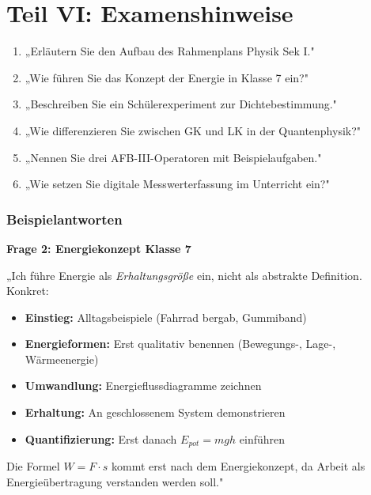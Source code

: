 \documentclass[11pt,a4paper]{article}
\begin{document}
\newpage
\part*{Teil VI: Examenshinweise}

\begin{exambox}
\begin{enumerate}[leftmargin=0.5cm, itemsep=3pt]
\item „Erläutern Sie den Aufbau des Rahmenplans Physik Sek I."
\item „Wie führen Sie das Konzept der Energie in Klasse 7 ein?"
\item „Beschreiben Sie ein Schülerexperiment zur Dichtebestimmung."
\item „Wie differenzieren Sie zwischen GK und LK in der Quantenphysik?"
\item „Nennen Sie drei AFB-III-Operatoren mit Beispielaufgaben."
\item „Wie setzen Sie digitale Messwerterfassung im Unterricht ein?"
\end{enumerate}
\end{exambox}

\section{Beispielantworten}

\textbf{Frage 2: Energiekonzept Klasse 7}

„Ich führe Energie als \textit{Erhaltungsgröße} ein, nicht als abstrakte Definition. Konkret:
\begin{itemize}[leftmargin=0.5cm, itemsep=1pt]
\item \textbf{Einstieg:} Alltagsbeispiele (Fahrrad bergab, Gummiband)
\item \textbf{Energieformen:} Erst qualitativ benennen (Bewegungs-, Lage-, Wärmeenergie)
\item \textbf{Umwandlung:} Energieflussdiagramme zeichnen
\item \textbf{Erhaltung:} An geschlossenem System demonstrieren
\item \textbf{Quantifizierung:} Erst danach $E_{pot} = mgh$ einführen
\end{itemize}
Die Formel $W = F \cdot s$ kommt erst nach dem Energiekonzept, da Arbeit als Energieübertragung verstanden werden soll."
\end{document}

